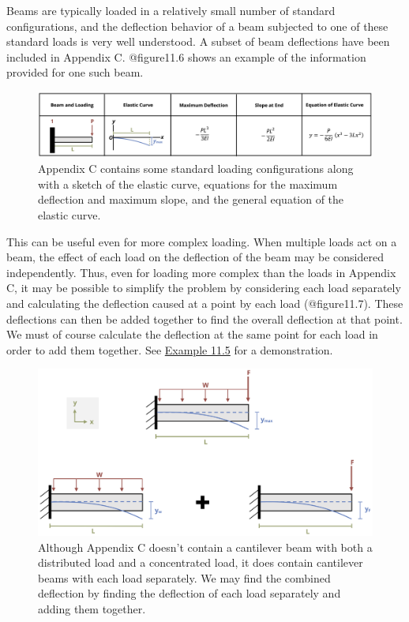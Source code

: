 \documentclass[
  letterpaper,
  DIV=11,
  numbers=noendperiod]{scrreprt}
\begin{document}
Beams are typically loaded in a relatively small number of standard
configurations, and the deflection behavior of a beam subjected to one
of these standard loads is very well understood. A subset of beam
deflections have been included in Appendix C. @figure11.6 shows an
example of the information provided for one such beam.

\begin{figure}

{\centering \includegraphics{images/CH11 PNGs/11.6.png}

}

\caption{Appendix C contains some standard loading configurations along
with a sketch of the elastic curve, equations for the maximum deflection
and maximum slope, and the general equation of the elastic curve.}

\end{figure}%

This can be useful even for more complex loading. When multiple loads
act on a beam, the effect of each load on the deflection of the beam may
be considered independently. Thus, even for loading more complex than
the loads in Appendix C, it may be possible to simplify the problem by
considering each load separately and calculating the deflection caused
at a point by each load (@figure11.7). These deflections can then be
added together to find the overall deflection at that point. We must of
course calculate the deflection at the same point for each load in order
to add them together. See \hyperref[example-11.5]{Example 11.5} for a
demonstration.

\begin{figure}

{\centering \includegraphics{images/CH11 PNGs/11.7.png}

}

\caption{Although Appendix C doesn't contain a cantilever beam with both
a distributed load and a concentrated load, it does contain cantilever
beams with each load separately. We may find the combined deflection by
finding the deflection of each load separately and adding them
together.}

\end{figure}%
\end{document}
